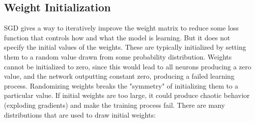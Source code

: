 \subsection{Weight Initialization}

SGD gives a way to iteratively improve the weight matrix to reduce some loss function that controls how and what the model is learning. But it does not specify the initial values of the weights. These are typically initialized by setting them to a random value drawn from some probability distribution. Weights cannot be initialized to zero, since this would lead to all neurons producing a zero value, and the network outputting constant zero, producing a failed learning process. Randomizing weights breaks the "symmetry" of initializing them to a particular value. If initial weights are too large, it could produce chaotic behavior (exploding gradients) and make the training process fail. There are many distributions that are used to draw initial weights:

